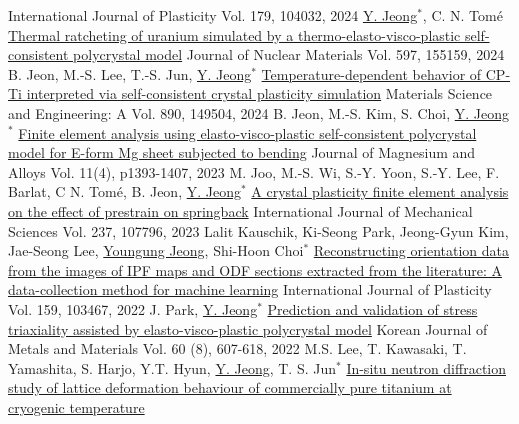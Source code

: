 \begin{cventries}
  {International Journal of Plasticity}
  {Vol. 179, 104032, 2024}
  {
  }
  \cventry
  {\underline{Y. Jeong}$^*$, C. N. Tom\'{e}}
  {\href{https://doi.org/10.1016/j.jnucmat.2024.155159}{Thermal ratcheting of uranium simulated by a thermo-elasto-visco-plastic self-consistent polycrystal model}}
  {Journal of Nuclear Materials}
  {Vol. 597, 155159, 2024}
  {
  }
  \cventry
  {B. Jeon, M.-S. Lee, T.-S. Jun, \underline{Y. Jeong}$^*$}
  {\href{https://doi.org/10.1016/j.msea.2023.145904}{Temperature-dependent behavior of CP-Ti interpreted via self-consistent crystal plasticity simulation}}
  {Materials Science and Engineering: A}
  {Vol. 890, 149504, 2024}
  {
  }
  \cventry
  {B. Jeon, M.-S. Kim, S. Choi, \underline{Y. Jeong}$^*$}
  {\href{https://doi.org/10.1016/j.jma.2022.10.017}{Finite element analysis using elasto-visco-plastic self-consistent polycrystal model for E-form Mg sheet subjected to bending}}
  {Journal of Magnesium and Alloys}
  {Vol. 11(4), p1393-1407, 2023}
  {
  }
  \cventry
  {M. Joo, M.-S. Wi, S.-Y. Yoon, S.-Y. Lee, F. Barlat, C N. Tom\'{e}, B. Jeon, \underline{Y. Jeong}$^*$}
  {\href{https://doi.org/10.1016/j.ijmecsci.2022.107796}{A crystal plasticity finite element analysis on the effect of prestrain on springback}}
  {International Journal of Mechanical Sciences}
  {Vol. 237, 107796, 2023}
  {
  }
  \cventry
  {Lalit Kauschik, Ki-Seong Park, Jeong-Gyun Kim, Jae-Seong Lee, \underline{Youngung Jeong}, Shi-Hoon Choi$^*$}
  {\href{https://doi.org/10.1016/j.ijplas.2022.103467}{Reconstructing orientation data from the images of IPF maps and ODF sections extracted from the literature: A data-collection method for machine learning}}
  {International Journal of Plasticity}
  {Vol. 159, 103467, 2022}
  {
  }
  \cventry
  {J. Park, \underline{Y. Jeong}$^*$}
  {\href{http://dx.doi.org/10.3365/KJMM.2022.60.8.607}{Prediction and validation of stress triaxiality assisted by elasto-visco-plastic polycrystal model}}
  {Korean Journal of Metals and Materials}
  {Vol. 60 (8), 607-618, 2022}
  {
  }
  \cventry
  {M.S. Lee, T. Kawasaki, T. Yamashita, S. Harjo, Y.T. Hyun, \underline{Y. Jeong}, T. S. Jun$^*$}
  {\href{https://doi.org/10.1038/s41598-022-07640-3}{In-situ neutron diffraction study of lattice deformation behaviour of commercially pure titanium at cryogenic temperature}}

\end{cventries}
